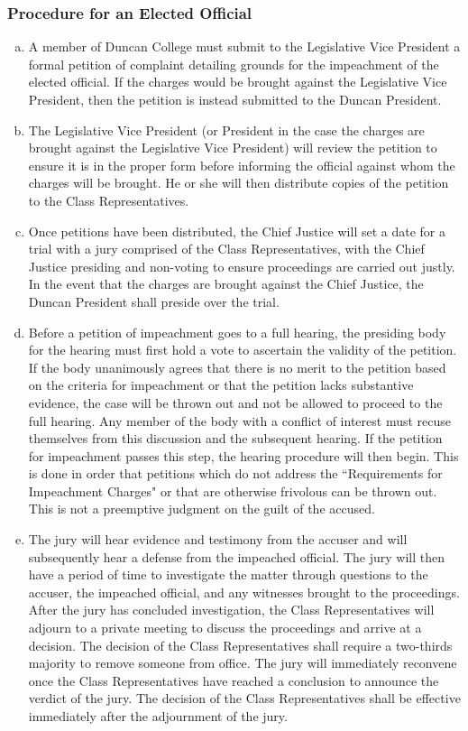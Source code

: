 \documentclass[USletter,12pt]{article}
\begin{document}
\begin{enumerate}[(a)]
\subsubsection{Procedure for an Elected Official}
\begin{enumerate}[(a)]
\item A member of Duncan College must submit to the Legislative Vice President a formal petition of complaint detailing grounds for the impeachment of the elected official.  If the charges would be brought against the Legislative Vice President, then the petition is instead submitted to the Duncan President.
\item The Legislative Vice President (or President in the case the charges are brought against the Legislative Vice President) will review the petition to ensure it is in the proper form before informing the official against whom the charges will be brought.  He or she will then distribute copies of the petition to the Class Representatives.
\item Once petitions have been distributed, the Chief Justice will set a date for a trial with a jury comprised of the Class Representatives, with the Chief Justice presiding and non-voting to ensure proceedings are carried out justly.  In the event that the charges are brought against the Chief Justice, the Duncan President shall preside over the trial.
\item Before a petition of impeachment goes to a full hearing, the presiding body for the hearing must first hold a vote to ascertain the validity of the petition. If the body unanimously agrees that there is no merit to the petition based on the criteria for impeachment or that the petition lacks substantive evidence, the case will be thrown out and not be allowed to proceed to the full hearing. Any member of the body with a conflict of interest must recuse themselves from this discussion and the subsequent hearing. If the petition for impeachment passes this step, the hearing procedure will then begin.  This is done in order that petitions which do not address the ``Requirements for Impeachment Charges" or that are otherwise frivolous can be thrown out.  This is not a preemptive judgment on the guilt of the accused.
\item The jury will hear evidence and testimony from the accuser and will subsequently hear a defense from the impeached official. The jury will then have a period of time to investigate the matter through questions to the accuser, the impeached official, and any witnesses brought to the proceedings. After the jury has concluded investigation, the Class Representatives will adjourn to a private meeting to discuss the proceedings and arrive at a decision. The decision of the Class Representatives shall require a two-thirds majority to remove someone from office. The jury will immediately reconvene once the Class Representatives have reached a conclusion to announce the verdict of the jury. The decision of the Class Representatives shall be effective immediately after the adjournment of the jury.

\end{enumerate}
\end{enumerate}
\end{document}
